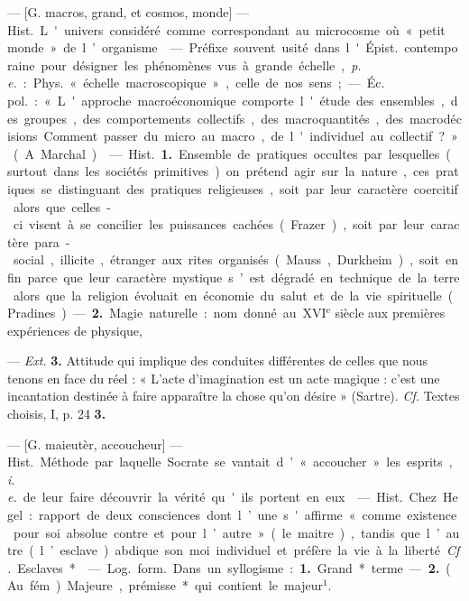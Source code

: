 
	\begin{itemize}[leftmargin=1cm, label=, itemsep=1pt]

 — [G. macros, grand, et
cosmos, monde] — \si{Hist.} L'univers
considéré comme correspondant au
microcosme où « petit monde » de
l’organisme.

 — Préfixe souvent usité dans
l'\si{Épist.} contemporaine pour désigner les phénomènes vus à grande
échelle, {\it p. e.} : \si{Phys.} « échelle macroscopique », celle de nos sens ;
— \si{Éc. pol.} : « L'approche macroéconomique
comporte l'étude des ensembles, des
groupes, des comportements collectifs, des macroquantités, des macrodécisions... Comment passer du micro
au macro, de l'individuel au collectif ? » (A. Marchal).

 — \si{Hist.} {\bf 1.} Ensemble de pratiques occultes par lesquelles (surtout dans les sociétés primitives) on
prétend agir sur la nature, ces pratiques se distinguant des pratiques
religieuses, soit par leur caractère
coercitif alors que celles-ci visent à
se concilier les puissances cachées
(Frazer), soit par leur caractère
para-social, illicite, étranger aux
rites organisés (Mauss, Durkheim),
soit enfin parce que leur caractère
mystique s’est dégradé en technique de la terre alors que la religion évoluait en économie du salut
et de la vie spirituelle (Pradines). —
 {\bf 2.} Magie naturelle : nom donné au
{\footnotesize XVI}$^\text{e}$ siècle aux premières expériences de physique,

— {\it Ext.} {\bf 3.} Attitude qui implique
des conduites différentes de celles
que nous tenons en face du réel :
« L’acte d'imagination est un acte
magique : c’est une incantation
destinée à faire apparaître la chose
qu’on désire » (Sartre). {\it Cf.} Textes
choisis, I, p. 24 {\bf 3.}

 — [G. maieutèr, accoucheur]
— \si{Hist.} Méthode par laquelle Socrate se vantait d’ « accoucher » les
esprits, {\it i. e.} de leur faire découvrir
la vérité qu'ils portent en eux.

 — \si{Hist.} Chez Hegel :
rapport de deux consciences dont
l’une s'affirme « comme existence
pour soi absolue contre et pour
l’autre » (le maitre), tandis que
l’autre (l’esclave) abdique son moi
individuel et préfère la vie à la
liberté. {\it Cf.} Esclaves*.

 — \si{Log.} \si{form.} Dans un syllogisme : {\bf 1.} Grand* terme. — {\bf 2.} (Au
fém.). Majeure, prémisse* qui contient le majeur$^1$.


\end{itemize}
